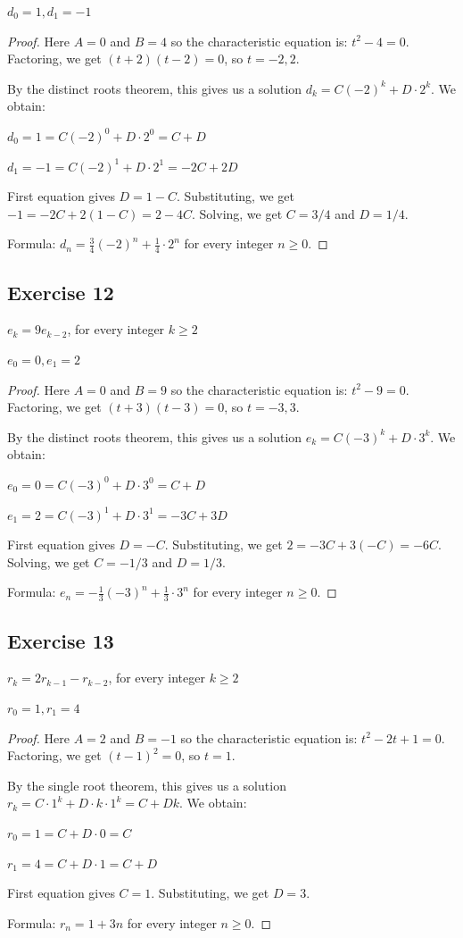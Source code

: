 \documentclass[14pt]{extarticle}
\begin{document}
\(d_0 = 1, d_1 = -1\)

\begin{proof}
Here $A = 0$ and $B = 4$ so the characteristic equation is: \(t^2 - 4 = 0\). 
Factoring, we get \((t + 2)(t - 2) = 0\), so $t = -2, 2$.

By the distinct roots theorem, this gives us a solution \(d_k = C(-2)^k + D \cdot 2^k\). We obtain:

\(d_0 = 1 = C(-2)^0 + D \cdot 2^0 = C + D\)

\(d_1 = -1 = C(-2)^1 + D \cdot 2^1 = -2C + 2D\)

First equation gives $D = 1 - C$. Substituting, we get \(-1 = -2C + 2(1 - C) = 2 - 4C\). Solving, we get $C = 3/4$ and $D = 1/4$.

Formula: \(d_n = \frac{3}{4}(-2)^n + \frac{1}{4} \cdot 2^n\) for every integer \(n \geq 0\).
\end{proof}

\subsection{Exercise 12}
\(e_k = 9e_{k-2}\), for every integer \(k \geq 2\)

\(e_0 = 0, e_1 = 2\)

\begin{proof}
Here $A = 0$ and $B = 9$ so the characteristic equation is: \(t^2 - 9 = 0\). 
Factoring, we get \((t + 3)(t - 3) = 0\), so $t = -3, 3$.

By the distinct roots theorem, this gives us a solution \(e_k = C(-3)^k + D \cdot 3^k\). We obtain:

\(e_0 = 0 = C(-3)^0 + D \cdot 3^0 = C + D\)

\(e_1 = 2 = C(-3)^1 + D \cdot 3^1 = -3C + 3D\)

First equation gives $D = - C$. Substituting, we get \(2 = -3C + 3(- C) = -6C\). Solving, we get $C = -1/3$ and $D = 1/3$.

Formula: \(e_n = -\frac{1}{3}(-3)^n + \frac{1}{3} \cdot 3^n\) for every integer \(n \geq 0\).
\end{proof}

\subsection{Exercise 13}
\(r_k = 2r_{k-1} - r_{k-2}\), for every integer \(k \geq 2\)

\(r_0 = 1, r_1 = 4\)

\begin{proof}
Here $A = 2$ and $B = -1$ so the characteristic equation is: \(t^2 - 2t +1 = 0\). 
Factoring, we get \((t - 1)^2 = 0\), so $t = 1$.

By the single root theorem, this gives us a solution \(r_k = C \cdot 1^k + D \cdot k \cdot 1^k = C + Dk\). We obtain:

\(r_0 = 1 = C + D \cdot 0 = C\)

\(r_1 = 4 = C + D \cdot 1 = C + D\)

First equation gives $C = 1$. Substituting, we get $D = 3$.

Formula: \(r_n = 1 + 3n\) for every integer \(n \geq 0\).
\end{proof}
\end{document}
